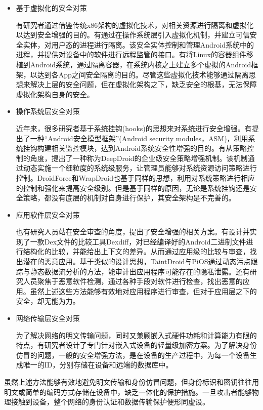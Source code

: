 \documentclass[12pt, a4paper]{article}
\begin{document}
	\begin{itemize}
	
	\item 基于虚拟化的安全对策
	
	有研究者通过借鉴传统x86架构的虚拟化技术，对相关资源进行隔离和虚拟化以达到安全增强的目的。有通过在操作系统层引入虚拟化机制，并建立可信安全实体，对用户态的进程进行隔离。该安全实体控制和管理Android系统中的进程，并提供对设备中的软件进行远程监管的接口。有将Linux的容器组件移植到Android系统，通过隔离容器，在系统内核之上建立多个虚拟的Android框架，以达到各App之间安全隔离的目的。尽管这些虚拟化技术能够通过隔离思想来解决上层的安全问题，但在虚拟化架构之下，缺乏安全的根基，无法保障虚拟化架构自身的安全。
	
	\item 操作系统层安全对策
	
	近年来，很多研究者基于系统挂钩(hooks)的思想来对系统进行安全增强。有提出了一种“Android安全模型框架”(Android security modules，ASM)，利用系统挂钩构建相关监控模块，达到Android系统安全性增强的目的。有从策略控制的角度，提出了一种称为DeepDroid的企业级安全策略增强机制。该机制通过动态实施一个细粒度的系统级服务，让管理员能够对系统资源访问策略进行控制。DroidForce和WrapDroid也基于同样的思想，利用对系统策略进行相应的控制和强化来提高安全级别。但是基于同样的原因，无论是系统挂钩还是安全策略，都没有底层的机制对自身进行保护，其安全架构是不完善的。
	
	\item 应用软件层安全对策
	
	也有研究人员站在安全审查的角度，提出了安全增强的相关方案。有设计并实现了一款Dex文件的比较工具Dexdiff，对已经编译好的Android二进制文件进行结构化的比较，并能给出上下文的差异。从而通过应用级的比较与审查，找出潜在的恶意应用。基于类似的设计思想，TaintDroid与PiOS通过动态污点跟踪与静态数据流分析的方法，能审计出应用程序可能存在的隐私泄露。还有研究人员聚焦于恶意软件检测，通过各种手段对软件进行检查，找出恶意的应用。虽然上述这些方法能够有效地对应用程序进行审查，但对于应用层之下的安全，却无能为力。
	
	\item 网络传输层安全对策
	
	为了解决网络的明文传输问题，同时又兼顾嵌入式硬件功耗和计算能力有限的特点，有研究者设计了专门针对嵌入式设备的轻量级加密方案。为了解决身份仿冒的问题，一般的安全增强方法，是在设备的生产过程中，为每一个设备生成唯一的ID，分别存储在设备和远端的数据库中。
	
	\end{itemize}
	虽然上述方法能够有效地避免明文传输和身份仿冒问题，但身份标识和密钥往往用明文或简单的编码方式存储在设备中，缺乏一体化的保护措施。一旦攻击者能够物理接触到设备，整个网络的身份认证和数据传输保护便形同虚设。	
	
\end{document}

